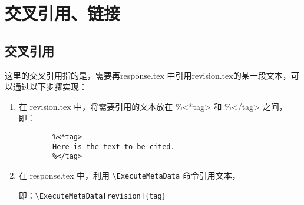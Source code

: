 \chapter{交叉引用、链接}
\section{交叉引用}
这里的交叉引用指的是，需要再response.tex 中引用revision.tex的某一段文本，可以通过以下步骤实现：

\begin{enumerate}[label=\arabic*]
    \item 在 revision.tex 中，将需要引用的文本放在 \%<*tag> 和 \%</tag> 之间，即：
    \begin{lstlisting}
        %<*tag>
        Here is the text to be cited.
        %</tag>
    \end{lstlisting}
    \item 在 response.tex 中，利用 \verb|\ExecuteMetaData| 命令引用文本，

    即：\verb|\ExecuteMetaData[revision]{tag}|

\end{enumerate}